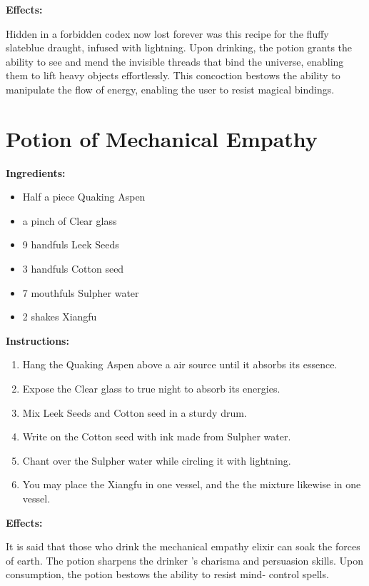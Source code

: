 \documentclass{article}
\begin{document}
\textbf{Effects:}

Hidden in a forbidden codex now lost forever was this recipe for the fluffy slateblue draught, infused with lightning. Upon drinking, the potion grants the ability to see and mend the invisible threads that bind the universe, enabling them to lift heavy objects effortlessly. This concoction bestows the ability to manipulate the flow of energy, enabling the user to resist magical bindings.

\newpage
\section*{Potion of Mechanical Empathy}

\textbf{Ingredients:}

\begin{itemize}
  \item Half a piece Quaking Aspen
  \item a pinch of Clear glass
  \item 9 handfuls Leek Seeds
  \item 3 handfuls Cotton seed
  \item 7 mouthfuls Sulpher water
  \item 2 shakes Xiangfu
\end{itemize}

\textbf{Instructions:}

\begin{enumerate}
  \item Hang the Quaking Aspen above a air source until it absorbs its essence.
  \item Expose the Clear glass to true night to absorb its energies.
  \item Mix Leek Seeds and Cotton seed in a sturdy drum.
  \item Write on the Cotton seed with ink made from Sulpher water.
  \item Chant over the Sulpher water while circling it with lightning.
  \item You may place the Xiangfu in one vessel, and the the mixture likewise in one vessel.
\end{enumerate}

\textbf{Effects:}

It is said that those who drink the mechanical empathy elixir can soak the forces of earth. The potion sharpens the drinker 's charisma and persuasion skills. Upon consumption, the potion bestows the ability to resist mind- control spells.
\end{document}
